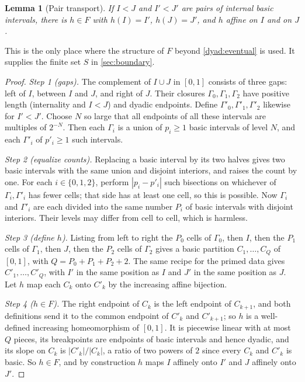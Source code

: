 \documentclass[11pt]{article}
\newtheorem{lemma}[theorem]{Lemma}
\theoremstyle{definition}
\numberwithin{equation}{section}
\begin{document}
\begin{lemma}[Pair transport]\label{dyad:transport}
If \(I<J\) and \(I'<J'\) are pairs of internal basic intervals, there is
\(h\in F\) with \(h(I)=I'\), \(h(J)=J'\), and \(h\) affine on \(I\) and on
\(J\).
\end{lemma}
This is the only place where the structure of \(F\) beyond
\cref{dyad:eventual} is used. It supplies the finite set \(S\) in
\cref{sec:boundary}.

\begin{proof}
\emph{Step 1 (gaps).} The complement of \(I\cup J\) in \([0,1]\) consists of
three gaps: left of \(I\), between \(I\) and \(J\), and right of \(J\). Their
closures \(\Gamma_0,\Gamma_1,\Gamma_2\) have positive length (internality and
\(I<J\)) and dyadic endpoints. Define
\(\Gamma'_0,\Gamma'_1,\Gamma'_2\) likewise for \(I'<J'\). Choose \(N\) so
large that all endpoints of all these intervals are multiples of \(2^{-N}\).
Then each \(\Gamma_i\) is a union of \(p_i\ge1\) basic intervals of level
\(N\), and each \(\Gamma'_i\) of \(p'_i\ge1\) such intervals.

\emph{Step 2 (equalize counts).} Replacing a basic interval by its two halves
gives two basic intervals with the same union and disjoint interiors, and
raises the count by one. For each \(i\in\{0,1,2\}\), perform \(|p_i-p'_i|\)
such bisections on whichever of \(\Gamma_i,\Gamma'_i\) has fewer cells; that
side has at least one cell, so this is possible. Now \(\Gamma_i\) and
\(\Gamma'_i\) are each divided into the same number \(P_i\) of basic
intervals with disjoint interiors. Their levels may differ from cell to cell,
which is harmless.

\emph{Step 3 (define \(h\)).} Listing from left to right the \(P_0\) cells of
\(\Gamma_0\), then \(I\), then the \(P_1\) cells of \(\Gamma_1\), then \(J\),
then the \(P_2\) cells of \(\Gamma_2\) gives a basic partition
\(C_1,\dots,C_Q\) of \([0,1]\), with \(Q=P_0+P_1+P_2+2\). The same recipe for
the primed data gives \(C'_1,\dots,C'_Q\), with \(I'\) in the same position as
\(I\) and \(J'\) in the same position as \(J\). Let \(h\) map each \(C_k\)
onto \(C'_k\) by the increasing affine bijection.

\emph{Step 4 (\(h\in F\)).} The right endpoint of \(C_k\) is the left
endpoint of \(C_{k+1}\), and both definitions send it to the common endpoint
of \(C'_k\) and \(C'_{k+1}\); so \(h\) is a well-defined increasing
homeomorphism of \([0,1]\). It is piecewise linear with at most \(Q\) pieces,
its breakpoints are endpoints of basic intervals and hence dyadic, and its
slope on \(C_k\) is \(|C'_k|/|C_k|\), a ratio of two powers of \(2\) since
every \(C_k\) and \(C'_k\) is basic. So \(h\in F\), and by construction \(h\)
maps \(I\) affinely onto \(I'\) and \(J\) affinely onto \(J'\).
\end{proof}
\end{document}
